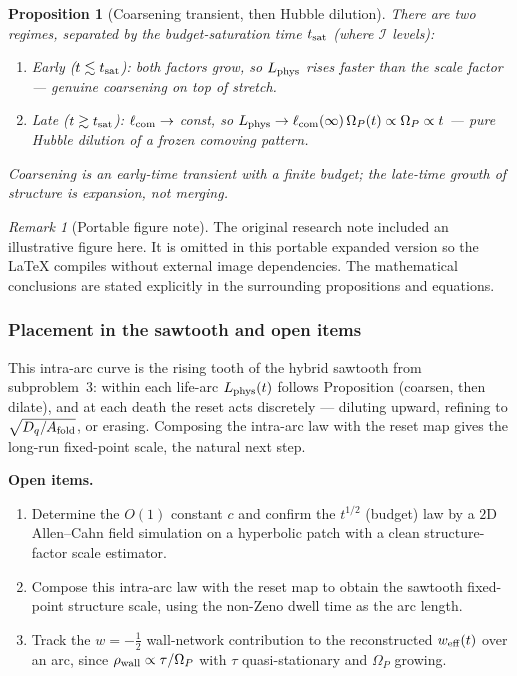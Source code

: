 \documentclass[11pt,a4paper]{article}
\newcommand{\Op}{\Omega_P}
\newcommand{\Af}{A_{\rm fold}}
\newcommand{\Dq}{D_q}
\newcommand{\lcom}{\ell_{\rm com}}
\newcommand{\Lphys}{L_{\rm phys}}
\newcommand{\Ibud}{\mathcal I}
\theoremstyle{plain}
\newtheorem{proposition}{Proposition}[section]
\theoremstyle{definition}
\theoremstyle{remark}
\newtheorem{remark}{Remark}[section]
\begin{document}
\begin{proposition}[Coarsening transient, then Hubble dilution]
There are two regimes, separated by the budget-saturation time $t_{\rm sat}$ (where $\Ibud$ levels):
\begin{enumerate}[label=(\roman*),leftmargin=1.8em,itemsep=2pt]
\item Early ($t\lesssim t_{\rm sat}$): both factors grow, so $\Lphys$ rises faster than the scale factor
--- genuine coarsening on top of stretch.
\item Late ($t\gtrsim t_{\rm sat}$): $\lcom\to$ const, so $\Lphys\to\lcom(\infty)\,\Op(t)\propto\Op\propto t$
--- pure Hubble dilution of a frozen comoving pattern.
\end{enumerate}
Coarsening is an early-time transient with a finite budget; the late-time growth of structure is
expansion, not merging.
\end{proposition}


\begin{remark}[Portable figure note]
The original research note included an illustrative figure here. It is omitted in this portable expanded version so the LaTeX compiles without external image dependencies. The mathematical conclusions are stated explicitly in the surrounding propositions and equations.\end{remark}


\subsubsection{Placement in the sawtooth and open items}

This intra-arc curve is the rising tooth of the hybrid sawtooth from subproblem~3: within each life-arc
$\Lphys(t)$ follows Proposition (coarsen, then dilate), and at each death the reset acts
discretely --- diluting upward, refining to $\sqrt{\Dq/\Af}$, or erasing. Composing the intra-arc law with
the reset map gives the long-run fixed-point scale, the natural next step.

\textbf{Open items.}
\begin{enumerate}[leftmargin=1.6em,itemsep=2pt]
\item Determine the $O(1)$ constant $c$ and confirm the $t^{1/2}$ (budget) law by a $2$D Allen--Cahn
field simulation on a hyperbolic patch with a clean structure-factor scale estimator.
\item Compose this intra-arc law with the reset map to obtain the sawtooth fixed-point structure scale,
using the non-Zeno dwell time as the arc length.
\item Track the $w=-\tfrac12$ wall-network contribution to the reconstructed $w_{\rm eff}(t)$ over an arc,
since $\rho_{\rm wall}\propto\tau/\Op$ with $\tau$ quasi-stationary and $\Op$ growing.
\end{enumerate}
\end{document}
